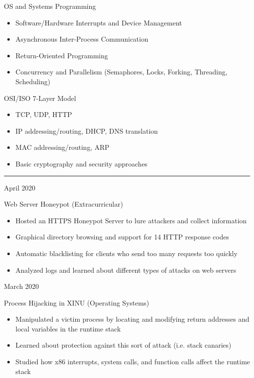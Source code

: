 \documentclass[a4paper]{article}
\newlength{\cvcolumngapwidth}
\newlength{\cvleftcolumnwidth}
\newlength{\cvrightcolumnwidth}
\newcommand{\cvsectionstyle}[1]{{\normalsize\cvsectionfont\textcolor{cvsectioncolor}{#1}}}
\newcommand{\cvtitlestyle}[1]{{\large\cvtitlefont\textcolor{cvtitlecolor}{#1}}}
\newcommand{\cvdurationstyle}[1]{{\small\cvdurationfont\textcolor{cvdurationcolor}{#1}}}
\newcommand{\cvheadingstyle}[1]{{\normalsize\cvheadingfont\textcolor{cvheadingcolor}{#1}}}
\newlength{\cvafteritemskipamount}
\newlength{\cvaftersectionskipamount}
\newlength{\cvaftertitleskipamount}
\newlength{\cvparskip}
\newcommand{\cvsection}[1]{
    \begin{minipage}[t]{\cvleftcolumnwidth}
        \raggedleft\cvsectionstyle{#1}
    \end{minipage}%
    \hspace{\cvcolumngapwidth}%
    \begin{minipage}[t]{\cvrightcolumnwidth}
        \textcolor{cvrulecolor}{\rule{\cvrightcolumnwidth}{0.3mm}}
    \end{minipage}

    \vspace{\cvaftersectionskipamount}
}
\newcommand{\cvitem}[2]{
    \begin{minipage}[t]{\cvleftcolumnwidth}
        \raggedleft #1
    \end{minipage}%
    \hspace{\cvcolumngapwidth}%
    \begin{minipage}[t]{\cvrightcolumnwidth}
        \setlength{\parskip}{\cvparskip} #2
    \end{minipage}

    \vspace{\cvafteritemskipamount}
}
\newcommand{\cvtitle}[1]{
    \cvtitlestyle{#1}

    \vspace{\cvaftertitleskipamount}
    \vspace{-\cvparskip}
}
\begin{document}
\cvitem{
    \cvheadingstyle{OS and Systems Programming}
}{
    \begin{itemize}[leftmargin=*]
      \item Software/Hardware Interrupts and Device Management
      \item Asynchronous Inter-Process Communication
      \item Return-Oriented Programming
      \item Concurrency and Parallelism (Semaphores, Locks, Forking, Threading, Scheduling)
    \end{itemize}
  \vspace{3mm}
}

\cvitem{
    \cvheadingstyle{OSI/ISO 7-Layer Model}
}{
    \begin{itemize}[leftmargin=*]
      \item TCP, UDP, HTTP
      \item IP addressing/routing, DHCP, DNS translation
      \item MAC addressing/routing, ARP
      \item Basic cryptography and security approaches
    \end{itemize}
}


\cvsection{\LARGE \textcolor{emphasiscolor}{PROJECTS}}

\cvitem{
    \cvdurationstyle{April 2020}
}{
  \cvtitle{Web Server Honeypot (Extracurricular)}

    \begin{itemize}[leftmargin=*]
        \item Hosted an HTTPS Honeypot Server to lure attackers and collect information
        \item Graphical directory browsing and support for 14 HTTP response codes
        \item Automatic blacklisting for clients who send too many requests too quickly
        \item Analyzed logs and learned about different types of attacks on web servers
    \end{itemize}
    \vspace{2mm}
}

% 
\cvitem{
    \cvdurationstyle{March 2020}
}{
  \cvtitle{Process Hijacking in XINU (Operating Systems)}

    \begin{itemize}[leftmargin=*]
        \item Manipulated a victim process by locating and modifying return addresses and local variables in the runtime stack
        \item Learned about protection against this sort of attack (i.e. stack canaries)
        \item Studied how x86 interrupts, system calls, and function calls affect the runtime stack
    \end{itemize}
    \vspace{2mm}
}
\end{document}
